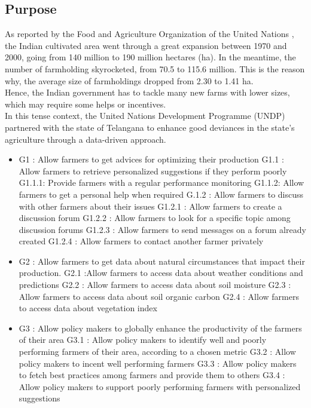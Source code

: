 \subsection{Purpose}
As reported by the Food and Agriculture Organization of the United Nations \cite{fao}, the Indian cultivated area went through a great expansion between 1970 and 2000, going from 140 million to 190 million hectares (ha). In the meantime, the number of farmholding skyrocketed, from 70.5 to 115.6 million. This is the reason why, the average size of farmholdings dropped from 2.30 to 1.41 ha. 
\\
Hence, the Indian government has to tackle many new farms with lower sizes, which may require some helps or incentives.
\\
In this tense context, the United Nations Development Programme (UNDP) partnered with the state of Telangana to enhance good deviances in the state's agriculture through a data-driven approach. 

\begin{itemize}
	\item
	G1 : Allow farmers to get advices for optimizing their production
	\subitem
	G1.1 : Allow farmers to retrieve personalized suggestions if they perform poorly
	\subsubitem
	G1.1.1: Provide farmers with a regular performance monitoring
	\subsubitem
	G1.1.2: Allow farmers to get a personal help when required
	\subitem
	G.1.2 : Allow farmers to discuss with other farmers about their issues
	\subsubitem
	G1.2.1 : Allow farmers to create a discussion forum
	\subsubitem
	G1.2.2 : Allow farmers to look for a specific topic among discussion forums
	\subsubitem
	G1.2.3 : Allow farmers to send messages on a forum already created
	\subsubitem
	G1.2.4 : Allow farmers to contact another farmer privately	
	\item
	G2 : Allow farmers to get data about natural circumstances that impact their production. 
	\subitem
	G2.1 :Allow farmers to access data about weather conditions and predictions
	\subitem
	G2.2 :
	Allow farmers to access data about soil moisture
	\subitem
	G2.3 :
	Allow farmers to access data about soil organic carbon
	\subitem
	G2.4 :
	Allow farmers to access data about vegetation index
	\item
	G3 : Allow policy makers to globally enhance the productivity of the farmers of their area
	\subitem
	G3.1 : Allow policy makers to identify well and poorly performing farmers of their area, according to a chosen metric
	\subitem
	G3.2 : Allow policy makers to incent well performing farmers
	\subitem
	G3.3 : Allow policy makers to fetch best practices among farmers and provide them to others
	\subitem
	G3.4 : Allow policy makers to support poorly performing farmers with personalized suggestions

	
\end{itemize}

